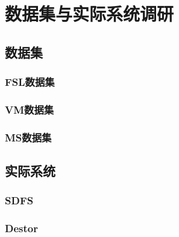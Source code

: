 \chapter{数据集与实际系统调研}
\section{数据集}
\subsection{FSL数据集}
\subsection{VM数据集}
\subsection{MS数据集}

\section{实际系统}
\subsection{SDFS}

\subsection{Destor}
